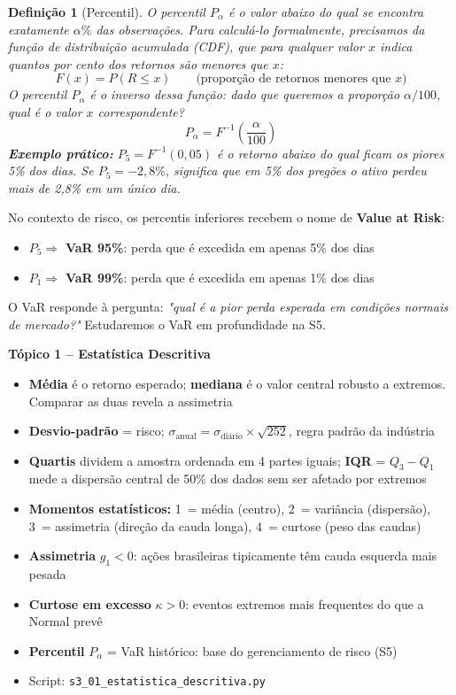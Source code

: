 \documentclass[11pt,a4paper]{article}
\newcommand{\code}[1]{%
  \colorbox{quantlightgray}{\texttt{\small\color{quantdark}#1}}%
}
\theoremstyle{quant}
\newtheorem{definicao}{Definição}[section]
\begin{document}
\begin{definicao}[Percentil]
O percentil $P_\alpha$ é o valor abaixo do qual se encontra exatamente $\alpha\%$
das observações. Para calculá-lo formalmente, precisamos da função de distribuição
acumulada (CDF), que para qualquer valor $x$ indica quantos por cento dos retornos
são menores que $x$:
\[
  F(x) = P(R \leq x) \qquad \text{(proporção de retornos menores que } x\text{)}
\]
O percentil $P_\alpha$ é o inverso dessa função: dado que queremos a proporção $\alpha/100$,
qual é o valor $x$ correspondente?
\[
  P_\alpha = F^{-1}\!\left(\frac{\alpha}{100}\right)
\]
\textbf{Exemplo prático:} $P_5 = F^{-1}(0{,}05)$ é o retorno abaixo do qual ficam
os piores 5\% dos dias. Se $P_5 = -2{,}8\%$, significa que em 5\% dos pregões
o ativo perdeu mais de 2,8\% em um único dia.
\end{definicao}

No contexto de risco, os percentis inferiores recebem o nome de \textbf{Value at Risk}:

\begin{itemize}
  \item $P_5 \Rightarrow$ \textbf{VaR 95\%}: perda que é excedida em apenas 5\% dos dias
  \item $P_1 \Rightarrow$ \textbf{VaR 99\%}: perda que é excedida em apenas 1\% dos dias
\end{itemize}

O VaR responde à pergunta: \emph{"qual é a pior perda esperada em condições normais de mercado?"}
Estudaremos o VaR em profundidade na S5.

\begin{caixaresumo}
\textbf{Tópico 1 -- Estatística Descritiva}
\begin{itemize}
  \item \textbf{Média} é o retorno esperado; \textbf{mediana} é o valor central robusto a extremos. Comparar as duas revela a assimetria
  \item \textbf{Desvio-padrão} = risco; $\sigma_{\text{anual}} = \sigma_{\text{diário}} \times \sqrt{252}$, regra padrão da indústria
  \item \textbf{Quartis} dividem a amostra ordenada em 4 partes iguais; \textbf{IQR} = $Q_3 - Q_1$ mede a dispersão central de 50\% dos dados sem ser afetado por extremos
  \item \textbf{Momentos estatísticos:} 1\textordmasculine\ = média (centro), 2\textordmasculine\ = variância (dispersão), 3\textordmasculine\ = assimetria (direção da cauda longa), 4\textordmasculine\ = curtose (peso das caudas)
  \item \textbf{Assimetria} $g_1 < 0$: ações brasileiras tipicamente têm cauda esquerda mais pesada
  \item \textbf{Curtose em excesso} $\kappa > 0$: eventos extremos mais frequentes do que a Normal prevê
  \item \textbf{Percentil} $P_\alpha$ = VaR histórico: base do gerenciamento de risco (S5)
  \item Script: \code{s3\_01\_estatistica\_descritiva.py}
\end{itemize}
\end{caixaresumo}
\end{document}
